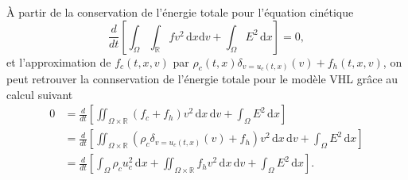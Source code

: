\begin{remark}
  À partir de la conservation de l'énergie totale pour l'équation cinétique 
  $$
    \frac{d}{dt} \left[ \int_\Omega \int_{\mathbb{R}} f v^2 \,\mathrm{d}x\mathrm{d}v + \int_\Omega E^2 \,\mathrm{d}x\right] = 0, 
  $$
  et l'approximation de $f_c(t, x, v)$ par $\rho_c(t, x) \delta_{v=u_c(t, x)}(v) + f_h(t, x, v)$, on peut retrouver la connservation de l'énergie totale pour le modèle VHL grâce au calcul suivant 
  $$
    \begin{aligned}
      0 &= \frac{d}{dt} \left[ \iint_{\Omega\times\mathbb{R}} (f_c + f_h) v^2 \,\mathrm{d}x\,\mathrm{d}v + \int_\Omega E^2 \,\mathrm{d}x\right] \\
        &= \frac{d}{dt} \left[\iint_{\Omega\times\mathbb{R}} (\rho_c \delta_{v=u_c(t, x)}(v)  + f_h) v^2 \,\mathrm{d}x\,\mathrm{d}v + \int_\Omega E^2 \,\mathrm{d}x\right] \\
        &= \frac{d}{dt} \left[ \int_\Omega \rho_c u_c^2 \,\mathrm{d}x+ \iint_{\Omega\times\mathbb{R}} f_h v^2 \,\mathrm{d}x\,\mathrm{d}v + \int_\Omega E^2 \,\mathrm{d}x\right]. 
    \end{aligned}
  $$
\end{remark}

